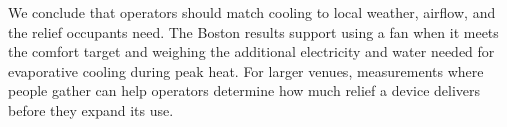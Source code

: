 We conclude that operators should match cooling to local weather, airflow, and the relief occupants need. The Boston results support using a fan when it meets the comfort target and weighing the additional electricity and water needed for evaporative cooling during peak heat. For larger venues, measurements where people gather can help operators determine how much relief a device delivers before they expand its use.

